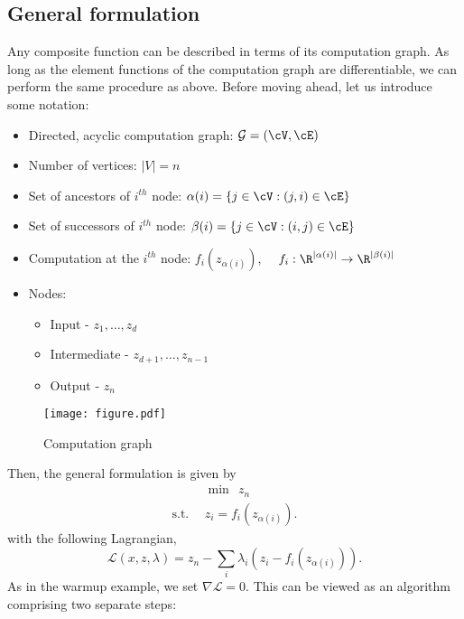 \subsection{General formulation}
Any composite function can be described in terms of its computation graph. As long as the element functions of the computation graph are differentiable, we can perform the same procedure as above. Before moving ahead, let us introduce some notation: 
\begin{itemize}
\item Directed, acyclic computation graph: $\mathcal{G} = (\cV, \cE)$
\item Number of vertices: $|V| = n$
\item Set of ancestors of $i^{th}$ node: $\alpha(i) = \{ j \in \cV: (j, i) \in \cE\}$
\item Set of successors of $i^{th}$ node: $\beta(i) = \{ j\in \cV: (i, j) \in \cE\}$
\item Computation at the $i^{th}$ node: $f_i(z_{\alpha(i)})$, $\quad f_i: \R^{|\alpha(i)|} \rightarrow \R^{|\beta(i)|}$
\item Nodes:
\begin{itemize}
\item Input - $z_1,\dots,z_ d$
\item Intermediate - $z_{d+1}, \dots, z_{n-1}$
\item Output - $z_n$
\end{itemize}
\end{itemize}

\begin{figure}
 \centering
\texttt{[image: figure.pdf]} 
\label{fig:subim1}
\caption{Computation graph}
\end{figure}
\noindent
Then, the general formulation is given by
\begin{align}
&\min \ \ z_n \\
\text{s.t.} \ \ &z_i = f_i(z_{\alpha(i)}). \nonumber
\end{align}
with the following Lagrangian,
\begin{equation}
\mathcal{L}(x, z, \lambda) = z_n - \sum_{i} \lambda_i (z_i - f_i(z_{\alpha(i)})).
\end{equation}
As in the warmup example, we set $\nabla \mathcal{L} = 0$. This can be viewed as an algorithm comprising two separate steps:

